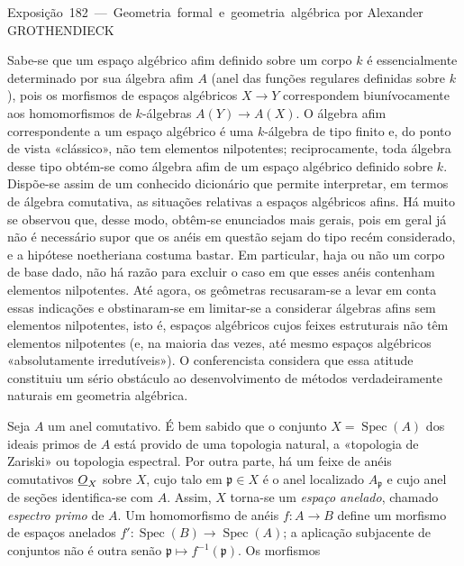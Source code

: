 \unit{Exposição 182 — Geometria formal e geometria algébrica}
%
  {por Alexander GROTHENDIECK}


Sabe-se que um espaço algébrico afim definido sobre um corpo $k$ é
essencialmente determinado por sua álgebra afim $A$ (anel das funções
regulares definidas sobre $k$), pois os morfismos de espaços algébricos
$X\longrightarrow Y$ correspondem biunívocamente aos homomorfismos de
$k$-álgebras $A(Y)\longrightarrow A(X)$. O álgebra afim correspondente a um
espaço algébrico é uma $k$-álgebra de tipo finito e, do ponto de vista
«clássico», não tem elementos nilpotentes; reciprocamente, toda álgebra desse
tipo obtém-se como álgebra afim de um espaço algébrico definido sobre $k$.
Dispõe-se assim de um conhecido dicionário que permite interpretar, em termos
de álgebra comutativa, as situações relativas a espaços algébricos afins.
Há muito se observou que, desse modo, obtêm-se enunciados mais gerais, pois em
geral já não é necessário supor que os anéis em questão sejam do tipo recém
considerado, e a hipótese noetheriana costuma bastar. Em particular, haja ou
não um corpo de base dado, não há razão para excluir o caso em que esses anéis
contenham elementos nilpotentes. Até agora, os geômetras recusaram-se a levar
em conta essas indicações e obstinaram-se em limitar-se a considerar álgebras
afins sem elementos nilpotentes, isto é, espaços algébricos cujos feixes
estruturais não têm elementos nilpotentes (e, na maioria das vezes, até mesmo
espaços algébricos «absolutamente irredutíveis»). O conferencista considera que
essa atitude constituiu um sério obstáculo ao desenvolvimento de métodos
verdadeiramente naturais em geometria algébrica.

Seja $A$ um anel comutativo. É bem sabido que o conjunto
$X=\operatorname{Spec}(A)$ dos ideais primos de $A$ está provido de uma
topologia natural, a «topologia de Zariski» ou topologia espectral. Por outra
parte, há um feixe de anéis comutativos $\underline{O}_X$ sobre $X$, cujo talo em
$\mathfrak p\in X$ é o anel localizado $A_{\mathfrak p}$ e cujo anel de
seções identifica-se com $A$. Assim, $X$ torna-se um \emph{espaço
anelado}, chamado \emph{espectro primo} de $A$. Um homomorfismo de anéis
$f:A\longrightarrow B$ define um morfismo de espaços anelados
$f':\operatorname{Spec}(B)\longrightarrow\operatorname{Spec}(A)$; a
aplicação subjacente de conjuntos não é outra senão
$\mathfrak p\longmapsto f^{-1}(\mathfrak p)$. Os morfismos

